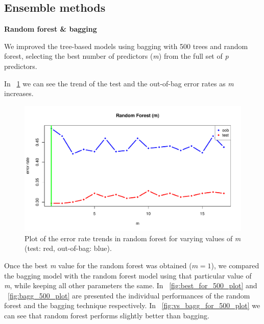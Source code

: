 \subsection{Ensemble methods}

\vspace{0.2cm}
\noindent
\textbf{Random forest \& bagging}

We improved the tree-based models using bagging with 500 trees and random forest, selecting the best number of predictors (\textit{m}) from the full set of \textit{p} predictors.

In \Fig~\ref{fig:m_best_for_500_plot} we can see the trend of the test and the out-of-bag error rates as \textit{m} increases.

\begin{figure}[h]
	\centering
	\includegraphics[width=0.5\linewidth]{ImageFiles/Classification/Trees/m_best_for_500_plot.pdf}
	\caption{Plot of the error rate trends in random forest for varying values of \textit{m} (test: red, out-of-bag: blue).}
	\label{fig:m_best_for_500_plot}
\end{figure}

Once the best \textit{m} value for the random forest was obtained ($m = 1$), we compared the bagging model with the random forest model using that particular value of \textit{m}, while keeping all other parameters the same.
In \Fig~\ref{fig:best_for_500_plot} and \Fig~\ref{fig:bagg_500_plot} are presented the individual performances of the random forest and the bagging technique respectively. 
In \Fig~\ref{fig:vs_bagg_for_500_plot} we can see that random forest performs slightly better than bagging. 

